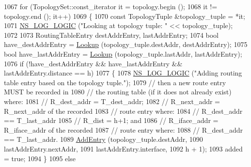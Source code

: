 \begin{DoxyCode}
1067       \textcolor{keywordflow}{for} (TopologySet::const\_iterator it = topology.begin ();
1068            it != topology.end (); it++)
1069         \{
1070           \textcolor{keyword}{const} TopologyTuple &topology\_tuple = *it;
1071           \hyperlink{group__logging_ga88acd260151caf2db9c0fc84997f45ce}{NS\_LOG\_LOGIC} (\textcolor{stringliteral}{"Looking at topology tuple: "} << topology\_tuple);
1072 
1073           RoutingTableEntry destAddrEntry, lastAddrEntry;
1074           \textcolor{keywordtype}{bool} have\_destAddrEntry = \hyperlink{classns3_1_1olsr_1_1RoutingProtocol_a514bf401454b233af509476fc3fd5d6b}{Lookup} (topology\_tuple.destAddr, destAddrEntry);
1075           \textcolor{keywordtype}{bool} have\_lastAddrEntry = \hyperlink{classns3_1_1olsr_1_1RoutingProtocol_a514bf401454b233af509476fc3fd5d6b}{Lookup} (topology\_tuple.lastAddr, lastAddrEntry);
1076           \textcolor{keywordflow}{if} (!have\_destAddrEntry && have\_lastAddrEntry && lastAddrEntry.distance == h)
1077             \{
1078               \hyperlink{group__logging_ga88acd260151caf2db9c0fc84997f45ce}{NS\_LOG\_LOGIC} (\textcolor{stringliteral}{"Adding routing table entry based on the topology tuple."});
1079               \textcolor{comment}{// then a new route entry MUST be recorded in}
1080               \textcolor{comment}{//                the routing table (if it does not already exist) where:}
1081               \textcolor{comment}{//                     R\_dest\_addr  = T\_dest\_addr;}
1082               \textcolor{comment}{//                     R\_next\_addr  = R\_next\_addr of the recorded}
1083               \textcolor{comment}{//                                    route entry where:}
1084               \textcolor{comment}{//                                    R\_dest\_addr == T\_last\_addr}
1085               \textcolor{comment}{//                     R\_dist       = h+1; and}
1086               \textcolor{comment}{//                     R\_iface\_addr = R\_iface\_addr of the recorded}
1087               \textcolor{comment}{//                                    route entry where:}
1088               \textcolor{comment}{//                                       R\_dest\_addr == T\_last\_addr.}
1089               \hyperlink{classns3_1_1olsr_1_1RoutingProtocol_a6ddb7dd3a6584b7d88dc5a41a61b1494}{AddEntry} (topology\_tuple.destAddr,
1090                         lastAddrEntry.nextAddr,
1091                         lastAddrEntry.interface,
1092                         h + 1);
1093               added = \textcolor{keyword}{true};
1094             \}
1095           \textcolor{keywordflow}{else}

\end{DoxyCode}
